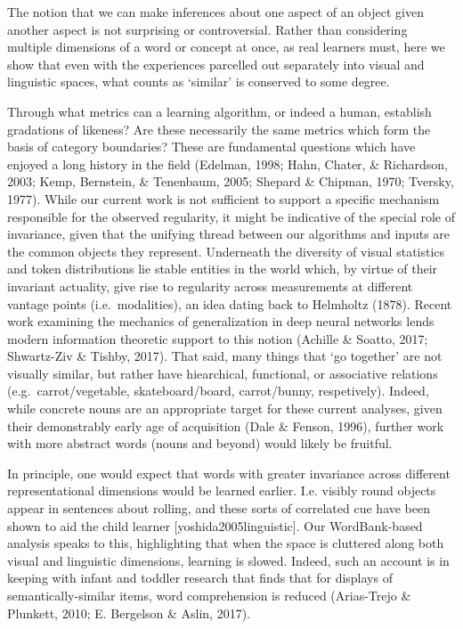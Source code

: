 \documentclass[10pt, letterpaper]{article}
\begin{document}
The notion that we can make inferences about one aspect of an object
given another aspect is not surprising or controversial. Rather than
considering multiple dimensions of a word or concept at once, as real
learners must, here we show that even with the experiences parcelled out
separately into visual and linguistic spaces, what counts as `similar'
is conserved to some degree.

Through what metrics can a learning algorithm, or indeed a human,
establish gradations of likeness? Are these necessarily the same metrics
which form the basis of category boundaries? These are fundamental
questions which have enjoyed a long history in the field (Edelman, 1998;
Hahn, Chater, \& Richardson, 2003; Kemp, Bernstein, \& Tenenbaum, 2005;
Shepard \& Chipman, 1970; Tversky, 1977). While our current work is not
sufficient to support a specific mechanism responsible for the observed
regularity, it might be indicative of the special role of invariance,
given that the unifying thread between our algorithms and inputs are the
common objects they represent. Underneath the diversity of visual
statistics and token distributions lie stable entities in the world
which, by virtue of their invariant actuality, give rise to regularity
across measurements at different vantage points (i.e.~modalities), an
idea dating back to Helmholtz (1878). Recent work examining the
mechanics of generalization in deep neural networks lends modern
information theoretic support to this notion (Achille \& Soatto, 2017;
Shwartz-Ziv \& Tishby, 2017). That said, many things that `go together'
are not visually similar, but rather have hiearchical, functional, or
associative relations (e.g.~carrot/vegetable, skateboard/board,
carrot/bunny, respetively). Indeed, while concrete nouns are an
appropriate target for these current analyses, given their demonstrably
early age of acquisition (Dale \& Fenson, 1996), further work with more
abstract words (nouns and beyond) would likely be fruitful.

In principle, one would expect that words with greater invariance across
different representational dimensions would be learned earlier. I.e.
visibly round objects appear in sentences about rolling, and these sorts
of correlated cue have been shown to aid the child learner
{[}yoshida2005linguistic{]}. Our WordBank-based analysis speaks to this,
highlighting that when the space is cluttered along both visual and
linguistic dimensions, learning is slowed. Indeed, such an account is in
keeping with infant and toddler research that finds that for displays of
semantically-similar items, word comprehension is reduced (Arias-Trejo
\& Plunkett, 2010; E. Bergelson \& Aslin, 2017).
\end{document}
